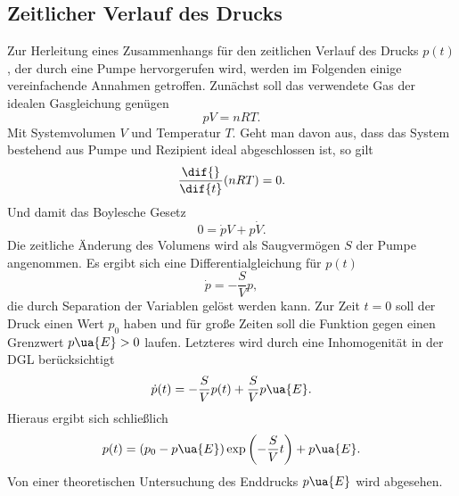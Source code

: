\subsection{Zeitlicher Verlauf des Drucks}
Zur Herleitung eines Zusammenhangs für den zeitlichen Verlauf des Drucks $p(t)$, der durch eine Pumpe
hervorgerufen wird, werden im Folgenden einige vereinfachende Annahmen getroffen. Zunächst soll das
verwendete Gas der idealen Gasgleichung genügen
\begin{equation}
  p V = n R T.
  \label{eq: ideale_gasgleichung}
\end{equation}
Mit Systemvolumen $V$ und Temperatur $T$. Geht man davon aus, dass das System bestehend aus
Pumpe und Rezipient ideal abgeschlossen ist, so gilt
\begin{equation}
  \frac{\dif{}}{\dif{t}}(n R T ) = 0.
\end{equation}
Und damit das Boylesche Gesetz
\begin{equation}
  0 = \dot{p}V  + p\dot{V}.
\end{equation}
Die zeitliche Änderung des Volumens wird als Saugvermögen $S$ der Pumpe angenommen. Es ergibt sich eine Differentialgleichung für $p(t)$
\begin{equation}
  \dot{p} = - \frac{S}{V} p,
\end{equation}
die durch Separation der Variablen gelöst werden kann. Zur Zeit $t = 0$ soll der Druck einen Wert $p_0$ haben und für große
Zeiten soll die Funktion gegen einen Grenzwert $p\ua{E} > 0$ laufen. Letzteres wird durch eine Inhomogenität in der DGL berücksichtigt
\begin{equation}
  \dot{p}(t) = - \frac{S}{V} p(t) + \frac{S}{V}p\ua{E}.
\end{equation}
Hieraus ergibt sich schließlich
\begin{equation}
  p(t) = (p_0 - p\ua{E})\exp\left(- \frac{S}{V} t \right) + p\ua{E}.
  \label{eq: evakuierungskurve}
\end{equation}
Von einer theoretischen Untersuchung des Enddrucks $p\ua{E}$ wird abgesehen.
